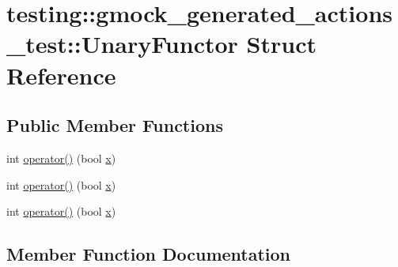 \hypertarget{structtesting_1_1gmock__generated__actions__test_1_1_unary_functor}{}\section{testing\+::gmock\+\_\+generated\+\_\+actions\+\_\+test\+::Unary\+Functor Struct Reference}
\label{structtesting_1_1gmock__generated__actions__test_1_1_unary_functor}
\subsection*{Public Member Functions}
\begin{DoxyCompactItemize}
\item 
int \mbox{\hyperlink{structtesting_1_1gmock__generated__actions__test_1_1_unary_functor_aeae4c0025faeac92845d652b35ac2846}{operator()}} (bool \mbox{\hyperlink{_obj__test_2lib_2googletest-master_2googlemock_2test_2gmock-matchers__test_8cc_a6150e0515f7202e2fb518f7206ed97dc}{x}})
\item 
int \mbox{\hyperlink{structtesting_1_1gmock__generated__actions__test_1_1_unary_functor_aeae4c0025faeac92845d652b35ac2846}{operator()}} (bool \mbox{\hyperlink{_obj__test_2lib_2googletest-master_2googlemock_2test_2gmock-matchers__test_8cc_a6150e0515f7202e2fb518f7206ed97dc}{x}})
\item 
int \mbox{\hyperlink{structtesting_1_1gmock__generated__actions__test_1_1_unary_functor_aeae4c0025faeac92845d652b35ac2846}{operator()}} (bool \mbox{\hyperlink{_obj__test_2lib_2googletest-master_2googlemock_2test_2gmock-matchers__test_8cc_a6150e0515f7202e2fb518f7206ed97dc}{x}})
\end{DoxyCompactItemize}


\subsection{Member Function Documentation}
\mbox{\label{structtesting_1_1gmock__generated__actions__test_1_1_unary_functor_aeae4c0025faeac92845d652b35ac2846}} 
